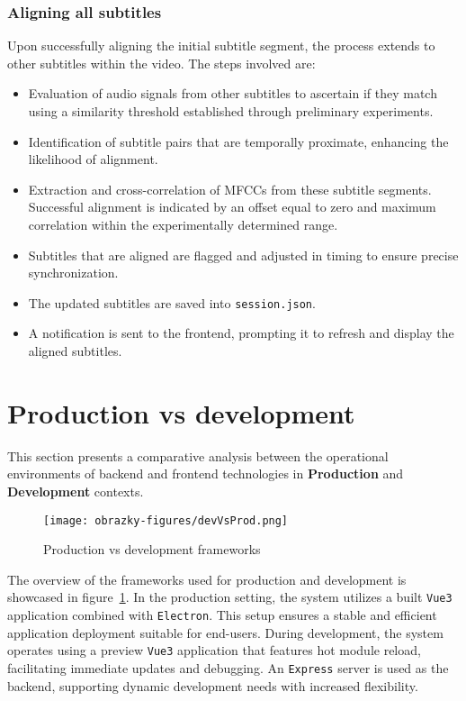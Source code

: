 \subsubsection{Aligning all subtitles}

Upon successfully aligning the initial subtitle segment, the process extends to other subtitles within the video. The steps involved are:
\begin{itemize}
\item Evaluation of audio signals from other subtitles to ascertain if they match using a similarity threshold established through preliminary experiments.
\item Identification of subtitle pairs that are temporally proximate, enhancing the likelihood of alignment.
\item Extraction and cross-correlation of MFCCs from these subtitle segments. Successful alignment is indicated by an offset equal to zero and maximum correlation within the experimentally determined range.
\item Subtitles that are aligned are flagged and adjusted in timing to ensure precise synchronization.
\item The updated subtitles are saved into \texttt{session.json}.
\item A notification is sent to the frontend, prompting it to refresh and display the aligned subtitles.
\end{itemize}

\section{Production vs development}

This section presents a comparative analysis between the operational environments of backend and frontend technologies in \textbf{Production} and \textbf{Development} contexts. 

\begin{figure}[ht]
    \centering
    \texttt{[image: obrazky-figures/devVsProd.png]}
    \caption{Production vs development frameworks}
    \label{fig:prodvsdev}
\end{figure}

The overview of the frameworks used for production and development is showcased in figure~\ref{fig:prodvsdev}. In the production setting, the system utilizes a built \texttt{Vue3} application combined with \texttt{Electron}. This setup ensures a stable and efficient application deployment suitable for end-users. During development, the system operates using a preview \texttt{Vue3} application that features hot module reload, facilitating immediate updates and debugging. An \texttt{Express} server is used as the backend, supporting dynamic development needs with increased flexibility.

